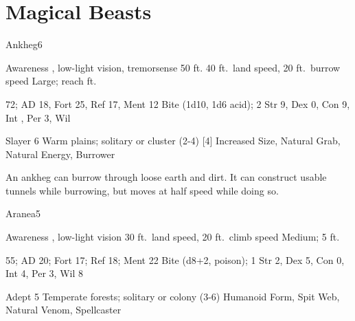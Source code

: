 \section{Magical Beasts}\label{Magical Beasts}

    \begin{monsection}{Ankheg}{6}
        \begin{spellcontent}
            \begin{spelltargetinginfo}
                \pari {} Awareness , low-light vision, tremorsense 50 ft.
                \pari {} 40 ft.\ land speed, 20 ft.\ burrow speed
                \pari {} Large;  reach ft.
            \end{spelltargetinginfo}
            \begin{spelleffects}
                \pari {} 72;  AD 18, Fort 25, Ref 17, Ment 12
                \pari {} Bite  (1d10, 1d6 acid);  2
                \pari {} Str 9, Dex 0, Con 9, Int , Per 3, Wil 
            \end{spelleffects}
        \end{spellcontent}
        \begin{spellfooter}
            \pari {} Slayer 6
            \pari {} Warm plains; solitary or cluster (2-4)
            \pari {} [4] Increased Size, Natural Grab, Natural Energy, Burrower
        \end{spellfooter}
    \end{monsection}

     An ankheg can burrow through loose earth and dirt.
    It can construct usable tunnels while burrowing, but moves at half speed while doing so.

    \begin{monsection}{Aranea}{5}
        \begin{spellcontent}
            \begin{spelltargetinginfo}
                \pari {} Awareness , low-light vision
                \pari {} 30 ft.\ land speed, 20 ft.\ climb speed
                \pari {} Medium;  5 ft.
            \end{spelltargetinginfo}
            \begin{spelleffects}
                \pari {} 55;  AD 20; Fort 17; Ref 18; Ment 22
                \pari {} Bite  (d8+2, poison);  1
                \pari {} Str 2, Dex 5, Con 0, Int 4, Per 3, Wil 8
            \end{spelleffects}
        \end{spellcontent}
        \begin{spellfooter}
            \pari {} Adept 5
            \pari {} Temperate forests; solitary or colony (3-6)
            \pari {} Humanoid Form, Spit Web, Natural Venom, Spellcaster
        \end{spellfooter}
    \end{monsection}

